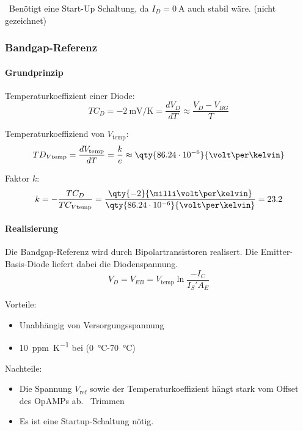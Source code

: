 \textrightarrow\ Benötigt eine Start-Up Schaltung, da $I_D = \qty{0}{\ampere}$ auch stabil wäre. (nicht gezeichnet)

\subsubsection{Bandgap-Referenz}
\paragraph{Grundprinzip}

Temperaturkoeffizient einer Diode: 
\[
    TC_D = \qty{-2}{\milli\volt\per\kelvin} = \frac{d V_D}{dT} \approx \frac{V_D-V_{BG}}{T}
\]

Temperaturkoeffiziend von $V_\mathrm{temp}$:
\[
    TD_{V\mathrm{temp}} = \frac{d V_\mathrm{temp}}{d T} = \frac{k}{e} \approx \qty{86.24\cdot10^{-6}}{\volt\per\kelvin} 
\]

Faktor $k$:
\[
    k = -\frac{TC_D}{TC_{V\mathrm{temp}}} = \frac{\qty{-2}{\milli\volt\per\kelvin}}{\qty{86.24\cdot10^{-6}}{\volt\per\kelvin}} = 23.2
\]

\paragraph{Realisierung}

Die Bandgap-Referenz wird durch Bipolartransistoren realisert.
Die Emitter-Basis-Diode liefert dabei die Diodenspannung.
\[
    V_D = V_{EB} = V_\mathrm{temp} \ln \frac{-I_C}{I_S' A_E}
\]

Vorteile:
\begin{itemize}
    \item Unabhängig von Versorgungsspannung
    \item \qty{10}{ppm\per\kelvin} bei (\qty{0}{\degreeCelsius}-\qty{70}{\degreeCelsius})
\end{itemize}
Nachteile:
\begin{itemize}
    \item Die Spannung $V_\mathrm{ref}$ sowie der Temperaturkoeffizient hängt stark vom Offset des OpAMPs ab. \textrightarrow\ Trimmen
    \item Es ist eine Startup-Schaltung nötig.
\end{itemize}